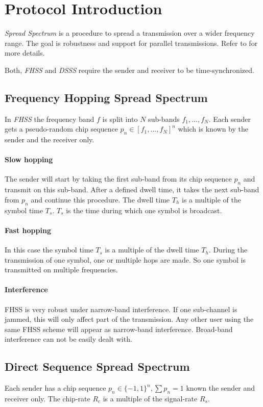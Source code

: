\section{Protocol Introduction}
	\emph{Spread  Spectrum} is a procedure to spread a transmission over a wider frequency range. The goal is robustness and support for parallel transmissions.
	Refer to \cite{ISS} for more details.
	
	Both, \emph{FHSS} and \emph{DSSS} require the sender and receiver to be time-synchronized. 
	
	\subsection{Frequency Hopping Spread Spectrum}
		In \emph{FHSS} the frequency band $f$ is split into $N$ sub-bands $f_1,..., f_N$. Each sender gets a pseudo-random chip sequence $p_n \in [f_1,...,f_N]^n$ which is known by the sender and the receiver only.
		
		\paragraph{Slow hopping} The sender will start by taking the first sub-band from its chip sequence $p_n$ and transmit on this sub-band.
		After a defined dwell time, it takes the next sub-band from $p_n$ and continue this procedure. The dwell time $T_h$ is a multiple of the symbol time $T_s$. $T_s$ is the time during which one symbol is broadcast.
		
		\paragraph{Fast hopping} In this case the symbol time $T_s$ is a multiple of the dwell time $T_h$. During the transmission of one symbol, one or multiple hops are made. So one symbol is transmitted on multiple frequencies.
		
		\paragraph{Interference} FHSS is very robust under narrow-band interference. If one sub-channel is jammed, this will only affect part of the transmission. Any other user using the same FHSS scheme will appear as narrow-band interference.
		Broad-band interference can not be easily dealt with.
		
	
	\subsection{Direct Sequence Spread Spectrum}
		Each sender has a chip sequence $p_n \in \{-1,1\}^n, \sum p_n = 1$ known the sender and receiver only. The chip-rate $R_c$ is a multiple of the signal-rate $R_s$.
		
